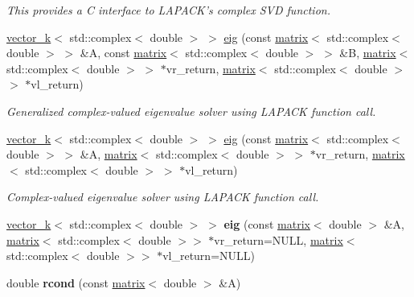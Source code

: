 \begin{DoxyCompactItemize}
\begin{DoxyCompactList}\small\item\em This provides a C interface to L\-A\-P\-A\-C\-K's complex S\-V\-D function. \end{DoxyCompactList}\item 
\hyperlink{classkeycpp_1_1vector__k}{vector\-\_\-k}$<$ std\-::complex$<$ double $>$ $>$ \hyperlink{namespacekeycpp_a516e693670ca88debd44ca9a48b2f225}{eig} (const \hyperlink{classkeycpp_1_1matrix}{matrix}$<$ std\-::complex$<$ double $>$ $>$ \&A, const \hyperlink{classkeycpp_1_1matrix}{matrix}$<$ std\-::complex$<$ double $>$ $>$ \&B, \hyperlink{classkeycpp_1_1matrix}{matrix}$<$ std\-::complex$<$ double $>$ $>$ $\ast$vr\-\_\-return, \hyperlink{classkeycpp_1_1matrix}{matrix}$<$ std\-::complex$<$ double $>$ $>$ $\ast$vl\-\_\-return)
\begin{DoxyCompactList}\small\item\em Generalized complex-\/valued eigenvalue solver using L\-A\-P\-A\-C\-K function call. \end{DoxyCompactList}\item 
\hyperlink{classkeycpp_1_1vector__k}{vector\-\_\-k}$<$ std\-::complex$<$ double $>$ $>$ \hyperlink{namespacekeycpp_ae24a17765339d2464a0cccb476782bff}{eig} (const \hyperlink{classkeycpp_1_1matrix}{matrix}$<$ std\-::complex$<$ double $>$ $>$ \&A, \hyperlink{classkeycpp_1_1matrix}{matrix}$<$ std\-::complex$<$ double $>$ $>$ $\ast$vr\-\_\-return, \hyperlink{classkeycpp_1_1matrix}{matrix}$<$ std\-::complex$<$ double $>$ $>$ $\ast$vl\-\_\-return)
\begin{DoxyCompactList}\small\item\em Complex-\/valued eigenvalue solver using L\-A\-P\-A\-C\-K function call. \end{DoxyCompactList}\item 
\hypertarget{namespacekeycpp_a42950497e518f5882a0689bb78fa667f}{\hyperlink{classkeycpp_1_1vector__k}{vector\-\_\-k}$<$ std\-::complex$<$ double $>$ $>$ {\bfseries eig} (const \hyperlink{classkeycpp_1_1matrix}{matrix}$<$ double $>$ \&A, \hyperlink{classkeycpp_1_1matrix}{matrix}$<$ std\-::complex$<$ double $>$$>$ $\ast$vr\-\_\-return=N\-U\-L\-L, \hyperlink{classkeycpp_1_1matrix}{matrix}$<$ std\-::complex$<$ double $>$$>$ $\ast$vl\-\_\-return=N\-U\-L\-L)}\label{namespacekeycpp_a42950497e518f5882a0689bb78fa667f}

\item 
\hypertarget{namespacekeycpp_a3905cfc35dbd146f5dbf7bcb5729c2c2}{double {\bfseries rcond} (const \hyperlink{classkeycpp_1_1matrix}{matrix}$<$ double $>$ \&A)}\label{namespacekeycpp_a3905cfc35dbd146f5dbf7bcb5729c2c2}


\end{DoxyCompactItemize}
